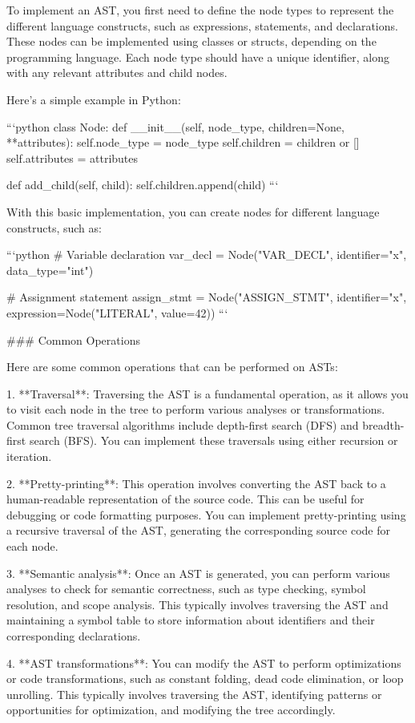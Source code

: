 \documentclass{article}
\begin{document}
To implement an AST, you first need to define the node types to represent the different language constructs, such as expressions, statements, and declarations. These nodes can be implemented using classes or structs, depending on the programming language. Each node type should have a unique identifier, along with any relevant attributes and child nodes.

Here's a simple example in Python:

```python
class Node:
    def __init__(self, node_type, children=None, **attributes):
        self.node_type = node_type
        self.children = children or []
        self.attributes = attributes

    def add_child(self, child):
        self.children.append(child)
```

With this basic implementation, you can create nodes for different language constructs, such as:

```python
# Variable declaration
var_decl = Node("VAR_DECL", identifier="x", data_type="int")

# Assignment statement
assign_stmt = Node("ASSIGN_STMT", identifier="x", expression=Node("LITERAL", value=42))
```

### Common Operations

Here are some common operations that can be performed on ASTs:

1. **Traversal**: Traversing the AST is a fundamental operation, as it allows you to visit each node in the tree to perform various analyses or transformations. Common tree traversal algorithms include depth-first search (DFS) and breadth-first search (BFS). You can implement these traversals using either recursion or iteration.

2. **Pretty-printing**: This operation involves converting the AST back to a human-readable representation of the source code. This can be useful for debugging or code formatting purposes. You can implement pretty-printing using a recursive traversal of the AST, generating the corresponding source code for each node.

3. **Semantic analysis**: Once an AST is generated, you can perform various analyses to check for semantic correctness, such as type checking, symbol resolution, and scope analysis. This typically involves traversing the AST and maintaining a symbol table to store information about identifiers and their corresponding declarations.

4. **AST transformations**: You can modify the AST to perform optimizations or code transformations, such as constant folding, dead code elimination, or loop unrolling. This typically involves traversing the AST, identifying patterns or opportunities for optimization, and modifying the tree accordingly.
\end{document}
